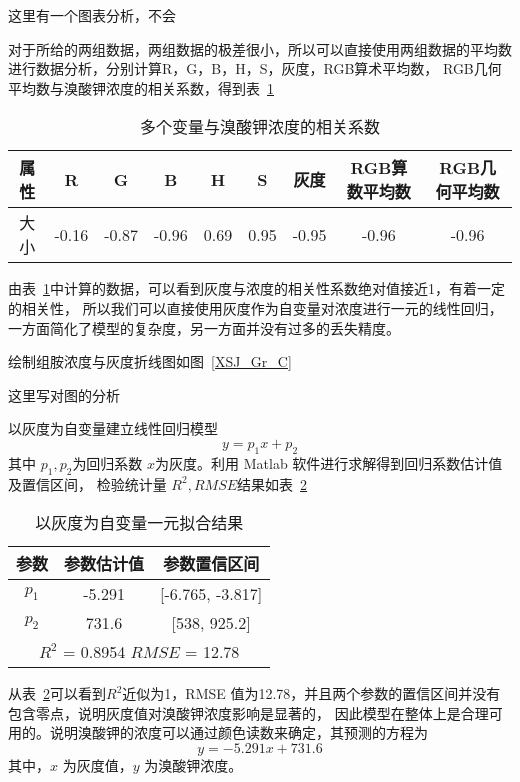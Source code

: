     这里有一个图表分析，不会

    对于所给的两组数据，两组数据的极差很小，所以可以直接使用两组数据的平均数进行数据分析，分别计算R，G，B，H，S，灰度，RGB算术平均数，
    RGB几何平均数与溴酸钾浓度的相关系数，得到表~\ref{多变量与溴酸钾浓度}

    \begin{table}[H]
        \centering
        \caption{多个变量与溴酸钾浓度的相关系数}
        \label{多变量与溴酸钾浓度}
        \begin{tabular}{@{}ccccccccc@{}}
        \toprule
        属性 & R     & G     & B     & H    & S    & 灰度    & RGB算数平均数 & RGB几何平均数 \\ \midrule
        大小 & -0.16 & -0.87 & -0.96 & 0.69 & 0.95 & -0.95 & -0.96    & -0.96    \\ \bottomrule
        \end{tabular}
        \end{table}

    由表~\ref{多变量与溴酸钾浓度}中计算的数据，可以看到灰度与浓度的相关性系数绝对值接近1，有着一定的相关性，
    所以我们可以直接使用灰度作为自变量对浓度进行一元的线性回归， 一方面简化了模型的复杂度，另一方面并没有过多的丢失精度。

    绘制组胺浓度与灰度折线图如图~\ref{XSJ_Gr_C}



    这里写对图的分析

    以灰度为自变量建立线性回归模型
    $$ y = p_1 x + p_2$$
    其中 $p_{1},p_{2}$为回归系数 $x$为灰度。利用 Matlab 软件进行求解得到回归系数估计值及置信区间，
    检验统计量 $R^2, RMSE $结果如表~\ref{溴酸钾一元拟合}

    \begin{table}[H]
        \centering
        \caption{以灰度为自变量一元拟合结果}
        \label{溴酸钾一元拟合}
        \begin{tabular}{@{}ccc@{}}
        \toprule
        参数        & 参数估计值      & 参数置信区间                   \\ \midrule
        $p_1$     & -5.291     & {[}-6.765, -3.817{]}     \\
        $p_2$     & 731.6      & {[}538, 925.2{]}         \\
        \hline
        \multicolumn{3}{c}{$R^2$ = 0.8954 $RMSE$ = 12.78} \\ \bottomrule
        \end{tabular}
        \end{table}
    从表~\ref{溴酸钾一元拟合}可以看到$R^2$近似为1，RMSE 值为12.78，并且两个参数的置信区间并没有包含零点，说明灰度值对溴酸钾浓度影响是显著的，
    因此模型在整体上是合理可用的。说明溴酸钾的浓度可以通过颜色读数来确定，其预测的方程为
    $$ y = -5.291 x + 731.6 $$ 
    其中，$x$ 为灰度值，$y$ 为溴酸钾浓度。

